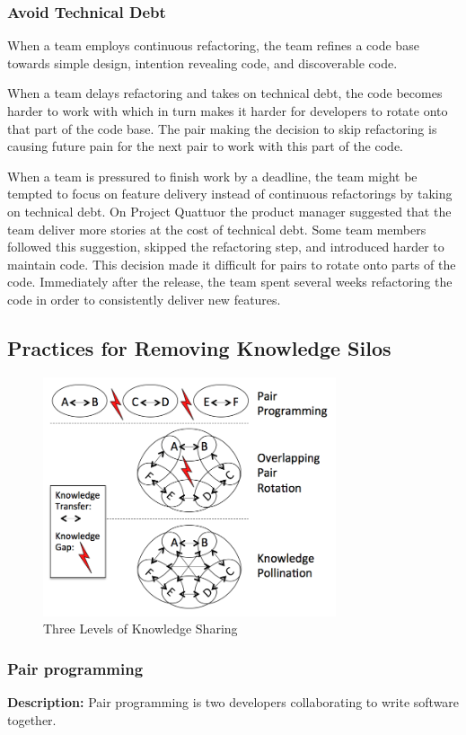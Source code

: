 \begin{table}[]
\subsubsection{Avoid Technical Debt}
When a team employs continuous refactoring, the team refines a code base towards simple design, intention revealing code, and discoverable code. 

When a team delays refactoring and takes on technical debt, the code becomes harder to work with which in turn makes it harder for developers to rotate onto that part of the code base. The pair making the decision to skip refactoring is causing future pain for the next pair to work with this part of the code. 

When a team is pressured to finish work by a deadline, the team might be tempted to focus on feature delivery instead of continuous refactorings by taking on technical debt. On Project Quattuor the product manager suggested that the team deliver more stories at the cost of technical debt. Some team members followed this suggestion, skipped the refactoring step, and introduced harder to maintain code. This decision made it difficult for pairs to rotate onto parts of the code. Immediately after the release, the team spent several weeks refactoring the code in order to consistently deliver new features.  
\subsection{Practices for Removing Knowledge Silos}
\begin{figure}[t]
\centering
\includegraphics[width=3.4in]{KnowledgeSharingLevels.png}
\caption{Three Levels of Knowledge Sharing}
\label{KnowledgeSharing}
\end{figure}

\subsubsection{Pair programming}
\textbf{Description:} Pair programming is two developers collaborating to write software together.


\end{table}
